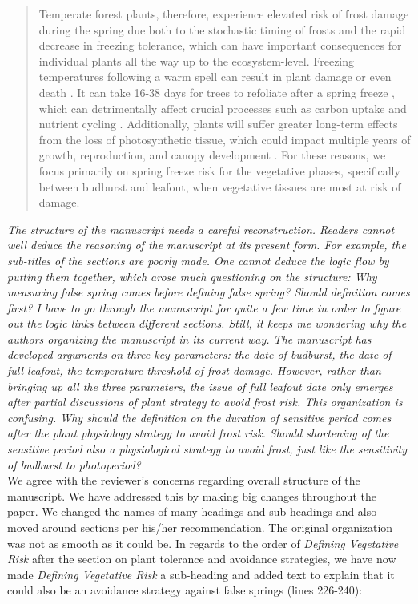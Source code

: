 \documentclass[11pt,a4paper]{article}
\begin{document}
\begin{quotation}
Temperate forest plants, therefore, experience elevated risk of frost damage during the spring due both to the stochastic timing of frosts and the rapid decrease in freezing tolerance, which can have important consequences for individual plants all the way up to the ecosystem-level. Freezing temperatures following a warm spell can result in plant damage or even death \citep{Ludlum1968, Mock2007}. It can take 16-38 days for trees to refoliate after a spring freeze \citep{Augspurger2009, Augspurger2013, Gu2008, Menzel2015}, which can detrimentally affect crucial processes such as carbon uptake and nutrient cycling \citep{Hufkens2012, Klosterman2018, Richardson2013}. Additionally, plants will suffer greater long-term effects from the loss of photosynthetic tissue, which could impact multiple years of growth, reproduction, and canopy development \citep{Vitasse2014, Xie2015}.  For these reasons, we focus primarily on spring freeze risk for the vegetative phases, specifically between budburst and leafout, when vegetative tissues are most at risk of damage.
\end{quotation}


\textit{The structure of the manuscript needs a careful reconstruction. Readers cannot well deduce the reasoning of the manuscript at its present form. For example, the sub-titles of the sections are poorly made. One cannot deduce the logic flow by putting them together, which arose much questioning on the structure: Why measuring false spring comes before defining false spring? Should definition comes first? I have to go through the manuscript for quite a few time in order to figure out the logic links between different sections. Still, it keeps me wondering why the authors organizing the manuscript in its current way. The manuscript has developed arguments on three key parameters: the date of budburst, the date of full leafout, the temperature threshold of frost damage. However, rather than bringing up all the three parameters, the issue of full leafout date only emerges after partial discussions of plant strategy to avoid frost risk. This organization is confusing. Why should the definition on the duration of sensitive period comes after the plant physiology strategy to avoid frost risk. Should shortening of the sensitive period also a physiological strategy to avoid frost, just like the sensitivity of budburst to photoperiod? } \\

We agree with the reviewer's concerns regarding overall structure of the manuscript. We have addressed this by making big changes throughout the paper. We changed the names of many headings and sub-headings and also moved around sections per his/her recommendation. The original organization was not as smooth as it could be. In regards to the order of \textit{Defining Vegetative Risk} after the section on plant tolerance and avoidance strategies, we have now made \textit{Defining Vegetative Risk} a sub-heading and added text to explain that it could also be an avoidance strategy against false springs (lines 226-240): \\
\end{document}
